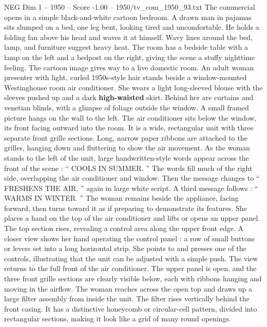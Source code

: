 \begin{textsample}{NEG Dim 1 – 1950 – Score -1.00 – 1950/tv\_com\_1950\_93.txt}  \label{ex:f1_neg_018}
The commercial opens in a simple black-and-white cartoon bedroom.
A drawn man in pajamas sits slumped on a bed, one leg bent, looking tired and uncomfortable.
He holds a folding fan above his head and waves it at himself.
Wavy lines around the bed, lamp, and furniture suggest heavy heat.
The room has a bedside table with a lamp on the left and a bedpost on the right, giving the scene a stuffy nighttime feeling.
The cartoon image gives way to a live domestic room.
An adult woman presenter with light, curled 1950s-style hair stands beside a window-mounted Westinghouse room air conditioner.
She wears a light long-sleeved blouse with the sleeves pushed up and a dark \textbf{high-waisted} skirt.
Behind her are curtains and venetian blinds, with a glimpse of foliage outside the window.
A small framed picture hangs on the wall to the left.
The air conditioner sits below the window, its front facing outward into the room.
It is a wide, rectangular unit with three separate front grille sections.
Long, narrow paper ribbons are attached to the grilles, hanging down and fluttering to show the air movement.
As the woman stands to the left of the unit, large handwritten-style words appear across the front of the scene : “ COOLS IN SUMMER. ” The words fill much of the right side, overlapping the air conditioner and window.
Then the message changes to “ FRESHENS THE AIR, ” again in large white script.
A third message follows : “ WARMS IN WINTER. ” The woman remains beside the appliance, facing forward, then turns toward it as if preparing to demonstrate its features.
She places a hand on the top of the air conditioner and lifts or opens an upper panel.
The top section rises, revealing a control area along the upper front edge.
A closer view shows her hand operating the control panel : a row of small buttons or levers set into a long horizontal strip.
She points to and presses one of the controls, illustrating that the unit can be adjusted with a simple push.
The view returns to the full front of the air conditioner.
The upper panel is open, and the three front grille sections are clearly visible below, each with ribbons hanging and moving in the airflow.
The woman reaches across the open top and draws up a large filter assembly from inside the unit.
The filter rises vertically behind the front casing.
It has a distinctive honeycomb or circular-cell pattern, divided into rectangular sections, making it look like a grid of many round openings.

\end{textsample}
